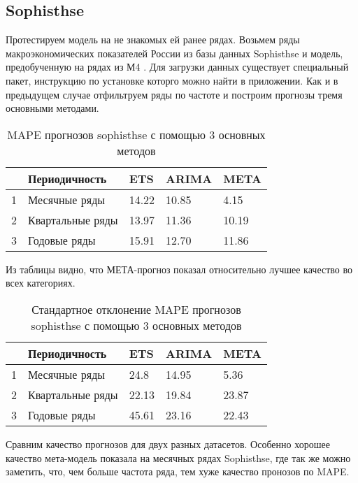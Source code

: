 \documentclass[a4paper,12pt]{article}
\theoremstyle{plain} %
\theoremstyle{definition} %
\theoremstyle{remark} %
\begin{document}
\subsection{Sophisthse}

Протестируем модель на не знакомых ей ранее рядах.
Возьмем ряды макроэкономических показателей России из базы данных Sophisthse и модель, предобученную на рядах из М4 .
Для загрузки данных существует специальный пакет, инструкцию по установке которго можно найти в приложении.
Как и в предыдущем случае отфильтруем ряды по частоте и построим прогнозы тремя основными методами.

\begin{table}[ht]
\centering
\begin{tabular}{rllll}
  \hline
 & Периодичность & ETS & ARIMA & META \\
  \hline
1 & Месячные ряды & 14.22 & 10.85 & 4.15 \\
  2 & Квартальные ряды & 13.97 & 11.36 & 10.19 \\
  3 & Годовые ряды & 15.91 & 12.70 & 11.86\\
   \hline
\end{tabular}
\caption{MAPE прогнозов sophisthse с помощью 3 основных методов}
\end{table}

Из таблицы видно, что МЕТА-прогноз показал относительно лучшее качество во всех категориях.


\begin{table}[ht]
\centering
\begin{tabular}{rllll}
  \hline
 & Периодичность & ETS & ARIMA & META \\
  \hline
1 & Месячные ряды & 24.8 & 14.95 & 5.36 \\
  2 & Квартальные ряды & 22.13 & 19.84 & 23.87\\
  3 & Годовые ряды & 45.61 & 23.16 & 22.43 \\
   \hline
\end{tabular}
\caption{Стандартное отклонение MAPE прогнозов sophisthse с помощью 3 основных методов}
\end{table}

Сравним качество прогнозов для двух разных датасетов.
Особенно хорошее качество мета-модель показала на месячных рядах Sophisthse, где так же можно заметить, что, чем больше частота ряда, тем хуже качество пронозов по MAPE.
\end{document}

